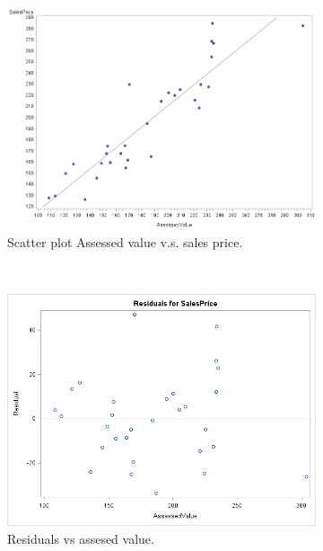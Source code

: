 \begin{enumerate}
\begin{figure}[htp]
  \centering
  \begin{subfigure}[b]{0.3\textwidth}
    \includegraphics[width=\textwidth]{img/scatter}
    \caption{Scatter plot Assessed value v.s. sales price.}
  \label{fig:2a}
  \end{subfigure}
    ~
  \begin{subfigure}[b]{0.3\textwidth}
    \includegraphics[width=\textwidth]{img/residuals}
    \caption{Residuals vs assesed value.}
    \label{fig:2b}
  \end{subfigure}
  ~
  \begin{subfigure}[b]{0.3\textwidth}

\end{subfigure}
\end{figure}
\end{enumerate}
